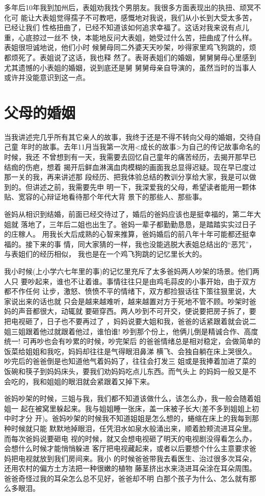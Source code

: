 \documentclass[12pt]{book}
\begin{document}
多年后10年我到加州后，表姐劝我找个男朋友。我很多方面表现出的执扭、顽冥不化可
能让大表姐觉得孺子不可教吧，感慨地对我说，我们从小长到大受太多苦，已经让我们
性格扭曲了，已经不知道该如何追求幸福了。这话对我来说有点儿重，心底掠过一丝不
快，本能地反问大表姐，她受过什么苦，扭曲成了什么样。表姐很坦诚地说，他们小时
候舅母同二外婆天天吵架，吵得家里鸡飞狗跳的，烦都烦死了。表姐说了这话，我也释
然了。表哥表姐们的婚姻，舅舅舅母心里感到尤其遗憾的小表姐的婚姻，说到底还是舅
舅舅母亲自导演的，虽然当时的当事人或许并没能意识到这一点。
\section{父母的婚姻}
\label{sec-9-31}

当我讲述完几乎所有其它亲人的故事，我终于还是不得不转向父母的婚姻，交待自己童
年时的故事。去年11月当我第一次用<成长的故事>为自己的传记故事命名的时候，我还
不曾想到有一天，我需要去回忆自己童年的痛苦经历，去揭开那早已结痂的伤疤，想着
揭开后鲜血淋漓血肉模糊的画面我总显得迟疑。现在早已度过那一关的我，再来讲述那
段经历、把我体验总结的教训分享给大家，我是可以做到的。但讲述之前，我需要先申
明一下，我深爱我的父母，希望读者能用一颗体贴、宽容的心辩证地看待那个年代大背
景下的那些人、那些事。

爸妈从相识到结婚，前面已经交待过了，婚后的爸妈应该也是挺幸福的，第二年大姐就
落地了，三年后二姐也出生了。爸妈一辈子都勤勤恳恳，是踏踏实实过日子的庄稼人。
用我长大后成熟的心智来推算，爸妈婚后的前八年十年可能都还挺幸福的。接下来的事
情，同大家猜的一样，我也没能逃脱大表姐总结出的“恶咒”，与表姐们的经历相似，
我也是在一个鸡飞狗跳的记忆里长大的。

我小时候(上小学六七年里的事)的记忆里充斥了太多爸妈两人吵架的场景。他们两人只
要吵起来，谁也不让着谁。事情往往只是由鸡毛蒜皮的小事开始，由于双方都不作任何
让步，激怒、愤愤不平的情绪下，双方都捡狠话往下策往狠里说，大家说出来的话也就
只会是越来越难听，越来越置对方于死地不管不顾。吵架时爸妈的声音都很大，动辄就
要砸穿西。两人吵到不可开交，便说要把房子拆了，要把电视砸了，日子也不要再过了
，妈妈说要大姐和我，爸爸的话紧跟着就会说二姐三姐跟着他过就跟着他过，谁怕谁! 
吵到那个份上，他俩儿倒是精诚合作、高度统一! 可再吵也会有吵累的时候，吵完架后
的爸爸情绪总是相对稳定，会做简单的饭菜给姐姐和我吃，妈妈却往往是气得眼泪鼻涕
横飞、会独自躺在床上哭很久。吵完后的爸爸倒是也知道他气着妈妈了，往往会打发三
姐或是我捧着加进了菜的饭碗和筷子到妈妈床头，要我们劝妈妈吃点儿东西。而气头上
的妈妈一般又是不会吃的，我和姐姐的眼泪就会紧跟着又掉下来。

爸妈吵架的时候，三姐与我，我们都不知道该做什么，该怎么办，我一般会随着姐姐一
起在被窝里躲起来。我与姐姐睡一张床，盖一床被子长大(差不多到姐姐上初中时才分
开)。爸妈吵架的时候我不知道姐姐是怎么想的，蜷缩在床上的我每到那种时候就只能
默默地掉眼泪，任凭泪水如泉水般涌出来，顺着脸颊流进耳朵里。而每次爸妈说要砸电
视的时候，就又会想电视砸了明天的电视剧没得看怎么办，会想什么时候才能悄悄躲进
客厅把电视藏起来，或者以后要想个什么主意要求爸妈把电视就放到我们房间来。我小
的时候爸爸带我去看医生、治过很多次耳朵，还用农村的偏方土方法把一种很嫩的植物
藤茎挤出水来浇进耳朵涂在耳朵周围。爸爸奇怪过我的耳朵怎么总不见好，爸爸却不明
白那个孩子为什么、怎么就有那么多眼泪。
\end{document}
